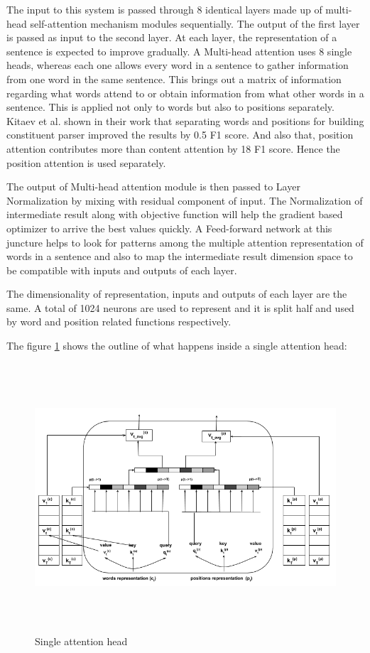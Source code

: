 \documentclass[a4paper, 11pt]{article}
\begin{document}
The input to this system is passed through 8 identical layers made up of multi-head self-attention mechanism modules sequentially. The output of the first layer is passed as input to the second layer. At each layer, the representation of a sentence is expected to improve gradually. A Multi-head attention uses 8 single heads, whereas each one allows every word in a sentence to gather information from one word in the same sentence. This brings out a matrix of information regarding what words attend to or obtain information from what other words in a sentence. This is applied not only to words but also to positions separately. Kitaev et al. \parencite*{Kitaev2019} shown in their work that separating words and positions for building constituent parser improved the results by 0.5 F1 score. And also that, position attention contributes more than content attention by 18 F1 score. Hence the position attention is used separately. 

The output of Multi-head attention module is then passed to Layer Normalization by mixing with residual component of input. The Normalization of intermediate result along with objective function will help the gradient based optimizer to arrive the best values quickly. A Feed-forward network at this juncture helps to look for patterns among the multiple attention representation of words in a sentence and also to map the intermediate result dimension space to be compatible with inputs and outputs of each layer.  

The dimensionality of representation, inputs and outputs of each layer are the same. A total of 1024 neurons are used to represent and it is split half and used by word and position related functions respectively. 


The figure \ref{fig:single_attention_head} shows the outline of what happens inside a single attention head:

\begin{figure}[htpb]
    \centering
    \includegraphics[width=\textwidth,height=10cm,keepaspectratio=true]
    {single-head-attention.png}
    \caption{
        Single attention head
    }
    \label{fig:single_attention_head}
\end{figure}
\end{document}
